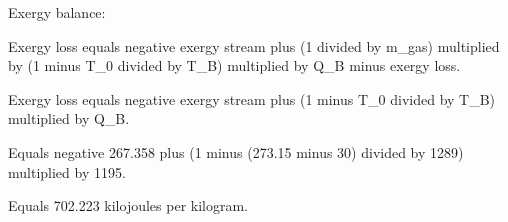 Exergy balance:  

Exergy loss equals negative exergy stream plus (1 divided by m_gas) multiplied by (1 minus T_0 divided by T_B) multiplied by Q_B minus exergy loss.  

Exergy loss equals negative exergy stream plus (1 minus T_0 divided by T_B) multiplied by Q_B.  

Equals negative 267.358 plus (1 minus (273.15 minus 30) divided by 1289) multiplied by 1195.  

Equals 702.223 kilojoules per kilogram.